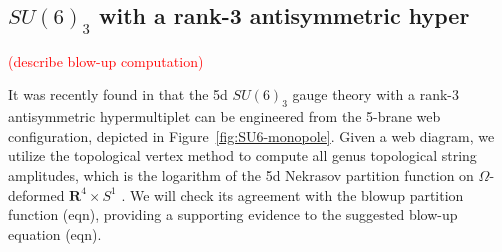 \documentclass[letterpaper, 11pt]{article}
\begin{document}
{\subsection{$SU(6)_3$ with a rank-3 antisymmetric hyper}

\textcolor{red}{(describe blow-up computation)}


It was recently found in \cite{Hayashi:2019yxj} that the 5d $SU(6)_3$ gauge theory with a rank-3 antisymmetric hypermultiplet can be engineered from the 5-brane web configuration, depicted in Figure~\ref{fig:SU6-monopole}. Given a web diagram, we utilize  the topological vertex method \cite{Aganagic:2003db,Iqbal:2007ii} to compute all genus topological string amplitudes, which is the logarithm of the 5d Nekrasov partition function on $\Omega$-deformed $\mathbf{R}^4\times S^1$ \cite{Gopakumar:1998jq}. We will check its agreement with the blowup partition function (eqn), providing a supporting evidence to the suggested blow-up equation (eqn).

}
\end{document}
